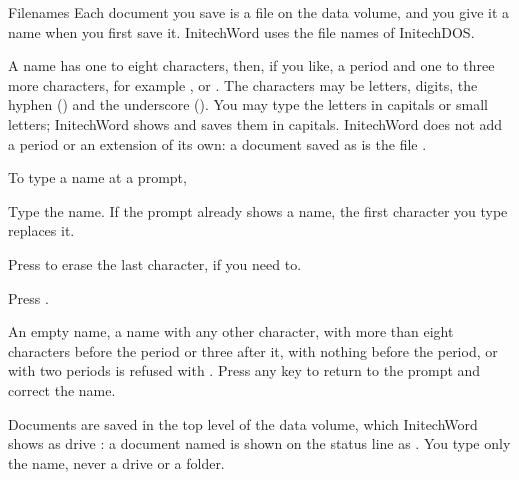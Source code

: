 \begin{Feature}{Filenames}
Each document you save is a file on the data volume, and you give it a
name when you first save it.  InitechWord uses the file names of
InitechDOS.

A name has one to eight characters, then, if you like, a period and one to
three more characters, for example ,  or
.  The characters may be letters, digits, the hyphen
(\Scr{-}) and the underscore (\Scr{\_}).  You may type the letters in
capitals or small letters; InitechWord shows and saves them in capitals.
InitechWord does not add a period or an extension of its own: a document
saved as  is the file .

To type a name at a prompt,
\begin{WPSteps}
\item Type the name.  If the prompt already shows a name, the first
character you type replaces it.
\item Press  to erase the last character, if you need to.
\item Press .
\end{WPSteps}

\Notes
{}
An empty name, a name with any other character, with more than eight
characters before the period or three after it, with nothing before the
period, or with two periods is refused with .  Press any key to
return to the prompt and correct the name.

Documents are saved in the top level of the data volume, which InitechWord
shows as drive : a document named  is shown on the
status line as .  You type only the name, never a drive or
a folder.

\end{Feature}

